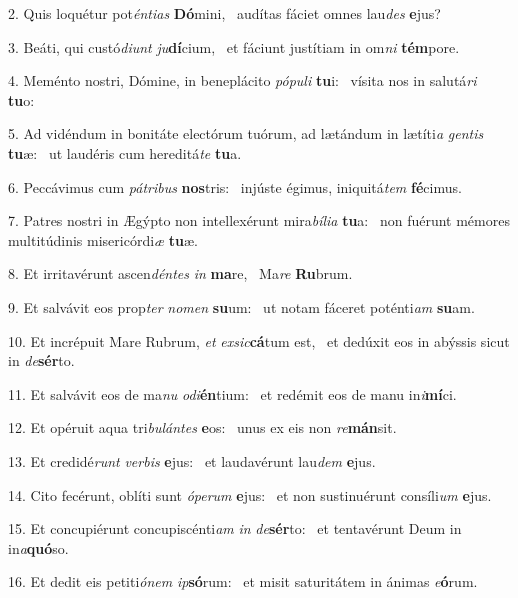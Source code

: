 2. Quis loquétur pot\textit{én}\textit{ti}\textit{as} \textbf{Dó}mini, \ast\  audítas fáciet omnes lau\textit{des} \textbf{e}jus?\

3. Beáti, qui custó\textit{di}\textit{unt} \textit{ju}\textbf{dí}cium, \ast\  et fáciunt justítiam in om\textit{ni} \textbf{tém}pore.\

4. Meménto nostri, Dómine, in beneplácito \textit{pó}\textit{pu}\textit{li} \textbf{tu}i: \ast\  vísita nos in salutá\textit{ri} \textbf{tu}o:\

5. Ad vidéndum in bonitáte electórum tuórum, ad lætándum in lætíti\textit{a} \textit{gen}\textit{tis} \textbf{tu}æ: \ast\  ut laudéris cum hereditá\textit{te} \textbf{tu}a.\

6. Peccávimus cum \textit{pá}\textit{tri}\textit{bus} \textbf{nos}tris: \ast\  injúste égimus, iniquitá\textit{tem} \textbf{fé}cimus.\

7. Patres nostri in Ægýpto non intellexérunt mira\textit{bí}\textit{li}\textit{a} \textbf{tu}a: \ast\  non fuérunt mémores multitúdinis misericórdi\textit{æ} \textbf{tu}æ.\

8. Et irritavérunt ascen\textit{dén}\textit{tes} \textit{in} \textbf{ma}re, \ast\  Ma\textit{re} \textbf{Ru}brum.\

9. Et salvávit eos prop\textit{ter} \textit{no}\textit{men} \textbf{su}um: \ast\  ut notam fáceret poténti\textit{am} \textbf{su}am.\

10. Et incrépuit Mare Rubrum, \textit{et} \textit{ex}\textit{sic}\textbf{cá}tum est, \ast\  et dedúxit eos in abýssis sicut in \textit{de}\textbf{sér}to.\

11. Et salvávit eos de ma\textit{nu} \textit{o}\textit{di}\textbf{én}tium: \ast\  et redémit eos de manu in\textit{i}\textbf{mí}ci.\

12. Et opéruit aqua tri\textit{bu}\textit{lán}\textit{tes} \textbf{e}os: \ast\  unus ex eis non \textit{re}\textbf{mán}sit.\

13. Et credidé\textit{runt} \textit{ver}\textit{bis} \textbf{e}jus: \ast\  et laudavérunt lau\textit{dem} \textbf{e}jus.\

14. Cito fecérunt, oblíti sunt \textit{ó}\textit{pe}\textit{rum} \textbf{e}jus: \ast\  et non sustinuérunt consíli\textit{um} \textbf{e}jus.\

15. Et concupiérunt concupiscénti\textit{am} \textit{in} \textit{de}\textbf{sér}to: \ast\  et tentavérunt Deum in in\textit{a}\textbf{quó}so.\

16. Et dedit eis petiti\textit{ó}\textit{nem} \textit{ip}\textbf{só}rum: \ast\  et misit saturitátem in ánimas \textit{e}\textbf{ó}rum.\

